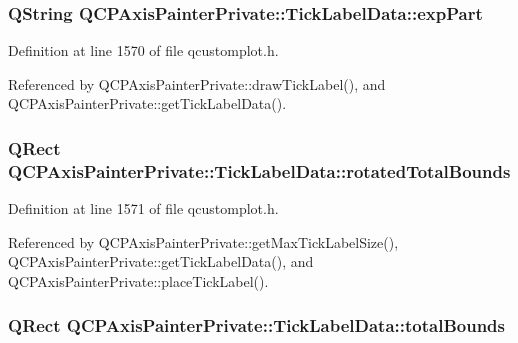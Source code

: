 \subsubsection[{exp\+Part}]{\setlength{\rightskip}{0pt plus 5cm}Q\+String Q\+C\+P\+Axis\+Painter\+Private\+::\+Tick\+Label\+Data\+::exp\+Part}\label{struct_q_c_p_axis_painter_private_1_1_tick_label_data_a09692e4ea092137278b4ac051d5fdf2b}


Definition at line 1570 of file qcustomplot.\+h.



Referenced by Q\+C\+P\+Axis\+Painter\+Private\+::draw\+Tick\+Label(), and Q\+C\+P\+Axis\+Painter\+Private\+::get\+Tick\+Label\+Data().

\hypertarget{struct_q_c_p_axis_painter_private_1_1_tick_label_data_aa4d38c5ea47c9184a78ee33ae7f1012e}{}
\subsubsection[{rotated\+Total\+Bounds}]{\setlength{\rightskip}{0pt plus 5cm}Q\+Rect Q\+C\+P\+Axis\+Painter\+Private\+::\+Tick\+Label\+Data\+::rotated\+Total\+Bounds}\label{struct_q_c_p_axis_painter_private_1_1_tick_label_data_aa4d38c5ea47c9184a78ee33ae7f1012e}


Definition at line 1571 of file qcustomplot.\+h.



Referenced by Q\+C\+P\+Axis\+Painter\+Private\+::get\+Max\+Tick\+Label\+Size(), Q\+C\+P\+Axis\+Painter\+Private\+::get\+Tick\+Label\+Data(), and Q\+C\+P\+Axis\+Painter\+Private\+::place\+Tick\+Label().

\hypertarget{struct_q_c_p_axis_painter_private_1_1_tick_label_data_afbb3163cf4c628914f1b703945419ea5}{}
\subsubsection[{total\+Bounds}]{\setlength{\rightskip}{0pt plus 5cm}Q\+Rect Q\+C\+P\+Axis\+Painter\+Private\+::\+Tick\+Label\+Data\+::total\+Bounds}\label{struct_q_c_p_axis_painter_private_1_1_tick_label_data_afbb3163cf4c628914f1b703945419ea5}


